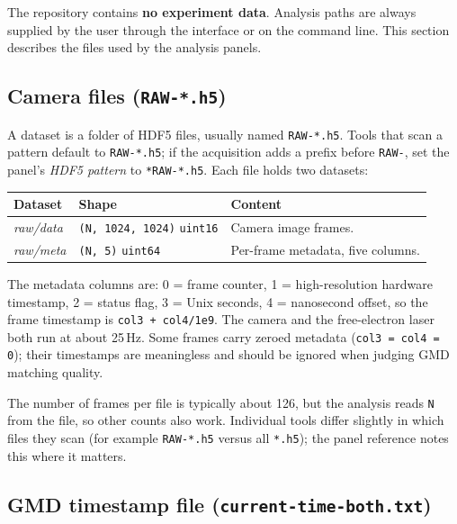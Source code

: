 \documentclass[11pt,a4paper]{article}
\newcommand{\code}[1]{\texttt{#1}}
\begin{document}
The repository contains \textbf{no experiment data}. Analysis paths are
always supplied by the user through the interface or on the command line.
This section describes the files used by the analysis panels.

\subsection{Camera files (\code{RAW-\allowbreak{}*.\allowbreak{}h5})}
\label{sec:rawdata}

A dataset is a folder of HDF5 files, usually named \code{RAW-\allowbreak{}*.\allowbreak{}h5}.
Tools that scan a pattern default to \code{RAW-\allowbreak{}*.\allowbreak{}h5}; if the
acquisition adds a prefix before \code{RAW-}, set the panel's
\emph{HDF5 pattern} to \code{*RAW-\allowbreak{}*.\allowbreak{}h5}.
Each file holds two datasets:

\begin{center}
\footnotesize
\begin{tabular}{@{}llp{8.6cm}@{}}
\toprule
Dataset & Shape & Content \\
\midrule
\emph{raw/\allowbreak{}data} & \code{(N, 1024, 1024)} \code{uint16} & Camera image frames. \\
\emph{raw/\allowbreak{}meta} & \code{(N, 5)} \code{uint64} & Per-frame metadata, five columns. \\
\bottomrule
\end{tabular}
\end{center}

The metadata columns are: 0 = frame counter, 1 = high-resolution hardware
timestamp, 2 = status flag, 3 = Unix seconds, 4 = nanosecond offset, so the
frame timestamp is \code{col3 + col4/\allowbreak{}1e9}. The camera and the free-electron
laser both run at about 25\,Hz. Some frames carry zeroed metadata
(\code{col3 = col4 = 0}); their timestamps are meaningless and should be
ignored when judging GMD matching quality.

The number of frames per file is typically about 126, but the analysis
reads \code{N} from the file, so other counts also work. Individual tools
differ slightly in which files they scan (for example \code{RAW-\allowbreak{}*.\allowbreak{}h5}
versus all \code{*.\allowbreak{}h5}); the panel reference notes this where it matters.

\subsection{GMD timestamp file (\code{current-\allowbreak{}time-\allowbreak{}both.\allowbreak{}txt})}
\label{sec:gmdfile}
\end{document}
